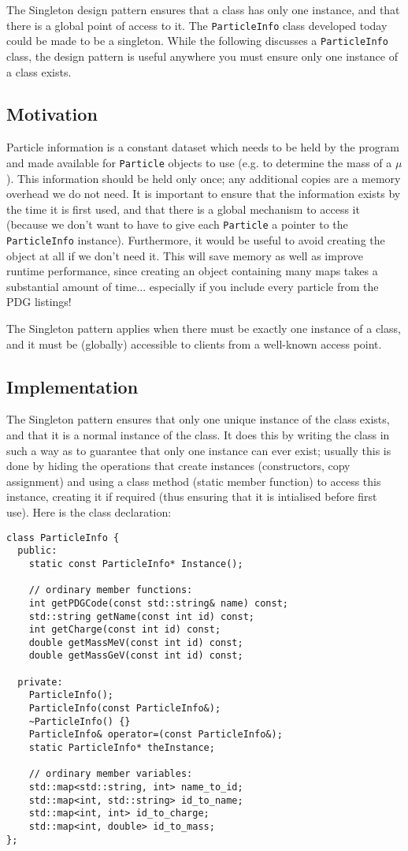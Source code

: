 \documentclass[a4paper]{scrartcl}
\begin{document}
The Singleton design pattern ensures that a class has only one instance, and that there is a global point of access to it. The \verb|ParticleInfo| class developed today could be made to be a singleton. While the following discusses a \verb|ParticleInfo| class, the design pattern is useful anywhere you must ensure only one instance of a class exists.

\subsection{Motivation}
Particle information is a constant dataset which needs to be held by the program and made available for \verb|Particle| objects to use (e.g. to determine the mass of a $\mu$). This information should be held only once; any additional copies are a memory overhead we do not need. It is important to ensure that the information exists by the time it is first used, and that there is a global mechanism to access it (because we don't want to have to give each \verb|Particle| a pointer to the \verb|ParticleInfo| instance). Furthermore, it would be useful to avoid creating the object at all if we don't need it. This will save memory as well as improve runtime performance, since creating an object containing many maps takes a substantial amount of time... especially if you include every particle from the PDG listings!

The Singleton pattern applies when there must be exactly one instance of a class, and it must be (globally) accessible to clients from a well-known access point.

\subsection{Implementation}
The Singleton pattern ensures that only one unique instance of the class exists, and that it is a normal instance of the class. It does this by writing the class in such a way as to guarantee that only one instance can ever exist; usually this is done by hiding the operations that create instances (constructors, copy assignment) and using a class method (static member function) to access this instance, creating it if required (thus ensuring that it is intialised before first use). Here is the class declaration:

\begin{verbatim}
class ParticleInfo {
  public:
    static const ParticleInfo* Instance();

    // ordinary member functions:
    int getPDGCode(const std::string& name) const;
    std::string getName(const int id) const;
    int getCharge(const int id) const;
    double getMassMeV(const int id) const;
    double getMassGeV(const int id) const;

  private:
    ParticleInfo();
    ParticleInfo(const ParticleInfo&);
    ~ParticleInfo() {}
    ParticleInfo& operator=(const ParticleInfo&);
    static ParticleInfo* theInstance;

    // ordinary member variables:
    std::map<std::string, int> name_to_id;
    std::map<int, std::string> id_to_name;
    std::map<int, int> id_to_charge;
    std::map<int, double> id_to_mass;
};
\end{verbatim}
\end{document}
